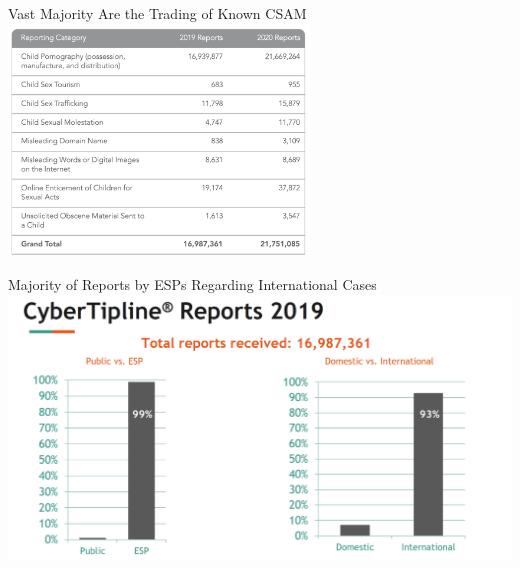 \documentclass[nobackground,dvipsnames,table,aspectratio=169]{beamer}
\begin{document}
\begin{frame}{Vast Majority Are the Trading of Known CSAM}
    \centering
    \includegraphics[width=0.6\textwidth]{reporting-categories}
\end{frame}

\begin{frame}{Majority of Reports by ESPs Regarding International Cases}
    \includegraphics[width=\textwidth]{cybertipline-esp-reports-mostly-international}
\end{frame}

\begin{frame}{}
    \thispagestyle{empty}
\end{frame}
\end{document}
